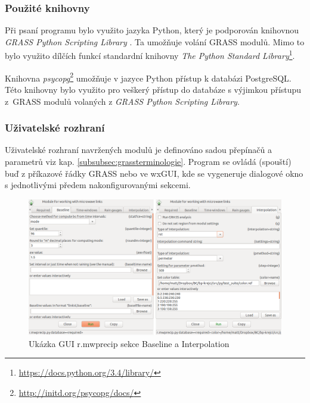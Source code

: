 \documentclass[a4paper,12pt,oneside]{report}
\begin{document}
\subsubsection{Použité knihovny}
Při psaní programu bylo využito jazyka Python, který je podporován
knihovnou \textit{GRASS Python Scripting Library} \cite{spygrass}. Ta
umožňuje volání GRASS modulů. Mimo to bylo využito dílčích funkcí standardní
knihovny \textit{The Python Standard
  Library}\footnote{\url{https://docs.python.org/3.4/library/}}.

Knihovna \textit{psycopg}\footnote{\url{http://initd.org/psycopg/docs/}}
umožňuje v jazyce Python přístup k databázi PostgreSQL. Této knihovny
bylo využito pro veškerý přístup do databáze s výjimkou přístupu z~GRASS
modulů volaných z \textit{GRASS Python Scripting Library}.

\subsubsection{Uživatelské rozhraní}
Uživatelské rozhraní navržených modulů je definováno sadou přepínačů
a~ para\-metrů viz kap. \ref{subsubsec:grassterminologie}. Program se
ovládá (spouští) buď z příkazové řádky GRASS nebo ve wxGUI, kde se
vygeneruje dialogové okno s jednotlivými předem nakonfigu\-rovanými
sekcemi.

\begin{figure}[h!]
    \centering
    \includegraphics[width=\textwidth]{./img/grass/gui.png}
    \caption[GUI modul]{Ukázka GUI r.mwprecip sekce Baseline a Interpolation  \centering  }
        \label{fig:baseline}
 \end{figure}
\end{document}
